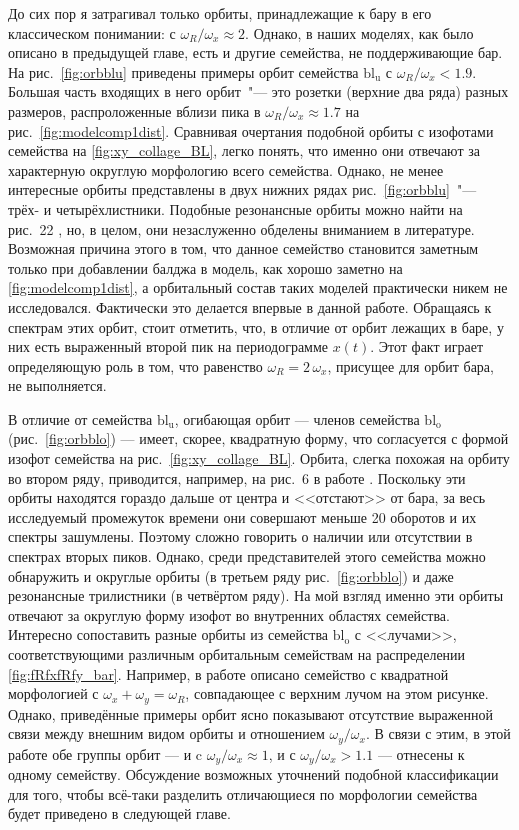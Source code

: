 \documentclass[tikz]{trlnotes}
\begin{document}
До сих пор я затрагивал только орбиты, принадлежащие к бару в его классическом понимании: с $ω_R/ω_x \approx 2$.
Однако, в наших моделях, как было описано в предыдущей главе, есть и другие семейства, не поддерживающие бар.
На рис.~\ref{fig:orbblu} приведены примеры орбит семейства $\text{bl}_{\text{u}}$ с $ω_R/ω_x < 1.9$. Большая часть 
входящих в него орбит~"--- это розетки (верхние два ряда) разных размеров, распроложенные вблизи пика в $ω_R/ω_x \approx 1.7$ на рис.~\ref{fig:modelcomp1dist}.
Сравнивая очертания подобной орбиты с изофотами семейства на \ref{fig:xy_collage_BL}, легко понять, что именно они отвечают
за характерную округлую морфологию всего семейства. Однако, не менее интересные орбиты представлены в двух нижних рядах рис.~\ref{fig:orbblu}~"--- трёх- и четырёхлистники. Подобные резонансные орбиты можно найти на рис.~22 \citet{voglis2007}, но, в целом, они незаслуженно обделены вниманием в литературе.
Возможная причина этого в том, что данное семейство становится заметным только при добавлении балджа в модель, как хорошо
заметно на \ref{fig:modelcomp1dist}, а орбитальный состав таких моделей практически никем не исследовался. Фактически это делается впервые в данной работе. 
Обращаясь к спектрам этих орбит, стоит отметить, что, в отличие от орбит лежащих в баре, у них есть выраженный второй пик на периодограмме $x(t)$. Этот факт играет определяющую роль в том, что  равенство $ω_R = 2\,ω_x$, присущее для орбит бара, не выполняется.

В отличие от семейства $\text{bl}_{\text{u}}$, огибающая орбит --- членов семейства $\text{bl}_{\text{o}}$ (рис.~\ref{fig:orbblo}) --- 
имеет, скорее, квадратную форму, что согласуется с формой изофот семейства на рис.~\ref{fig:xy_collage_BL}. Орбита, слегка похожая на орбиту во втором ряду, приводится, например, на рис.~6 в работе \cite{gajda2016}. Поскольку эти орбиты находятся
гораздо дальше от центра и <<отстают>> от бара, за весь исследуемый промежуток времени они совершают меньше 20 оборотов и их спектры зашумлены. Поэтому сложно говорить о наличии или отсутствии в спектрах вторых пиков. Однако, среди представителей этого семейства можно обнаружить и округлые орбиты (в третьем ряду рис.~\ref{fig:orbblo}) и даже резонансные трилистники (в четвёртом ряду). 
На мой взгляд именно эти орбиты отвечают за округлую форму изофот во внутренних областях семейства. 
Интересно сопоставить разные орбиты из семейства $\text{bl}_\text{o}$ с <<лучами>>, соответствующими различным орбитальным семействам на распределении \ref{fig:fRfxfRfy_bar}. 
Например, в работе \cite{gajda2016} описано семейство с квадратной морфологией с $ω_x + ω_y = ω_R$, совпадающее с верхним 
лучом на этом рисунке. Однако, приведённые примеры орбит ясно показывают отсутствие выраженной связи между внешним видом орбиты и отношением $ω_y/ω_x$.
В связи с этим, в этой работе обе группы орбит --- и c $ω_y/ω_x \approx 1$, и с $ω_y/ω_x > 1.1$ --- отнесены к одному семейству. 
Обсуждение возможных уточнений подобной классификации для того, 
чтобы всё-таки разделить отличающиеся по морфологии семейства будет приведено в следующей главе.
\end{document}
